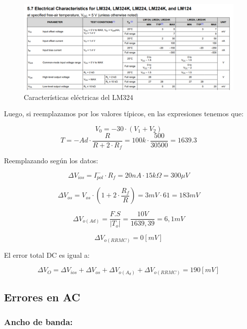 \begin{figure}[h!]
    \centering
    \includegraphics[width=1\linewidth]{img/dc_datasheet.png}
    \caption{Características eléctricas del LM324}
    \label{fig:caracteristicas}
\end{figure}
   
Luego, si reemplazamos por los valores típicos, en las expresiones tenemos que:


\[V_{0} = -30 \cdot (V_1 + V_2) \]
\[T = - Ad   \cdot  \frac{R}{R + 2\cdot R_f} = 100k \cdot \frac{500}{30500} = 1639.3\]

Reemplazando según los datos:
 
\[ \Delta V_{ios} = I_{pol}^{-} \cdot R_f = 20 nA \cdot 15k\Omega = 300 \mu V \]

\vspace{1em}

\[ \Delta V_{os}  = V_{os} \cdot (1 + 2 \cdot \frac {R_f}{R})  =
3mV \cdot 61 = 183 mV \]

\vspace{1em}

\[ \Delta V_{o (Ad)}=\frac{F.S}{\left|T_{o}\right|} = \frac{10V}{1639,39} = 6,1 mV\]

\vspace{1em}

\[ \Delta V_{o (RRMC) } = 0 [ mV ]\]

El error total DC es igual a:

\[ \Delta V_{O} = \Delta V_{ios} + \Delta V_{os} +  \Delta V_{o (A_d)} + \Delta V_{o (RRMC) } = 190 [mV]\]

\subsection{Errores en AC}
 
\subsubsection{Ancho de banda:}

